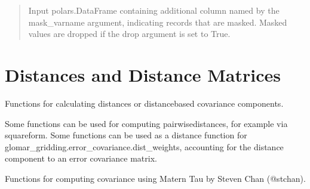 \documentclass[letterpaper,10pt,english]{sphinxmanual}
\begin{document}
\begin{fulllineitems}
\begin{quote}
\begin{description}
\begin{itemize}
\end{itemize}

\sphinxAtStartPar
{} \textendash{} Input polars.DataFrame containing additional column named by the
mask\_varname argument, indicating records that are masked. Masked values
are dropped if the drop argument is set to True.

\sphinxAtStartPar
{}

\end{description}\end{quote}

\end{fulllineitems}



\section{Distances and Distance Matrices}
\label{\detokenize{misc:module-glomar_gridding.distances}}\label{\detokenize{misc:distances-and-distance-matrices}}
\sphinxAtStartPar
Functions for calculating distances or distance\sphinxhyphen{}based covariance components.

\sphinxAtStartPar
Some functions can be used for computing pairwise\sphinxhyphen{}distances, for example via
squareform. Some functions can be used as a distance function for
glomar\_gridding.error\_covariance.dist\_weights, accounting for the distance
component to an error covariance matrix.

\sphinxAtStartPar
Functions for computing covariance using Matern Tau by Steven Chan (@stchan).
\end{document}
